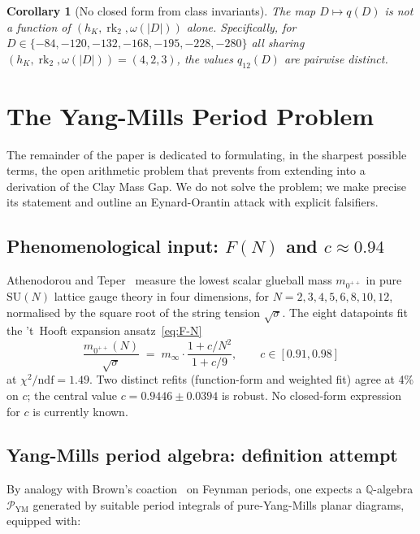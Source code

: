 \documentclass[11pt]{amsart}
\newtheorem{corollary}[theorem]{Corollary}
\theoremstyle{definition}
\theoremstyle{remark}
\DeclareMathOperator{\rk}{rk}
\newcommand{\Q}{\mathbb{Q}}
\begin{document}
\begin{corollary}[No closed form from class invariants]\label{cor:no-closed}
The map $D \mapsto q(D)$ is not a function of $(h_K, \rk_2,
\omega(|D|))$ alone. Specifically, for $D \in \{-84, -120, -132, -168,
-195, -228, -280\}$ all sharing $(h_K, \rk_2, \omega(|D|)) = (4, 2, 3)$,
the values $q_{12}(D)$ are pairwise distinct.
\end{corollary}

\section{The Yang-Mills Period Problem}\label{sec:gap3}

The remainder of the paper is dedicated to formulating, in the
sharpest possible terms, the open arithmetic problem that prevents
 from extending into a derivation of the Clay Mass Gap.
We do not solve the problem; we make precise its statement and outline
an Eynard-Orantin attack with explicit falsifiers.

\subsection{Phenomenological input: $F(N)$ and $c \approx 0.94$}
\label{ss:F-N-anchor}
Athenodorou and Teper~\cite{Athenodorou2021} measure the lowest scalar
glueball mass $m_{0^{++}}$ in pure $\mathrm{SU}(N)$ lattice gauge
theory in four dimensions, for $N = 2, 3, 4, 5, 6, 8, 10, 12$,
normalised by the square root of the string tension $\sqrt{\sigma}$.
The eight datapoints fit the 't~Hooft expansion ansatz~\eqref{eq:F-N}
\begin{equation*}
\frac{m_{0^{++}}(N)}{\sqrt{\sigma}} \; = \; m_\infty \cdot
\frac{1 + c/N^2}{1 + c/9}, \qquad c \in [0.91, 0.98]
\end{equation*}
at $\chi^2/\mathrm{ndf} = 1.49$. Two distinct refits (function-form
and weighted fit) agree at 4\% on $c$; the central value
$c = 0.9446 \pm 0.0394$ is robust. No closed-form expression for $c$
is currently known.

\subsection{Yang-Mills period algebra: definition attempt}\label{ss:P-YM-def}
By analogy with Brown's coaction~\cite{Brown2017} on Feynman periods,
one expects a $\Q$-algebra $\mathcal{P}_{\mathrm{YM}}$ generated by
suitable period integrals of pure-Yang-Mills planar diagrams, equipped
with:
\end{document}
